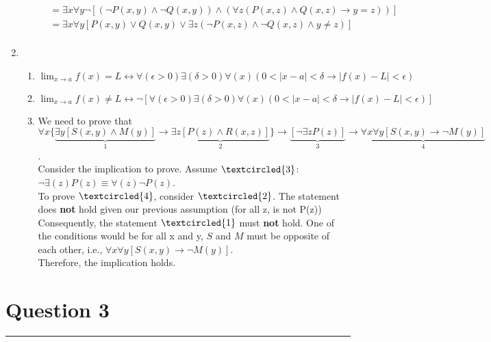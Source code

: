 \documentclass{article}
\begin{document}
\begin{enumerate}[label=\alph*.]
\begin{enumerate}[label=\roman*.]
\[\begin{aligned}
                             & = \exists x \forall y \neg[(\lnot P(x,y)\land\lnot Q(x,y)) \land (\forall z(P(x,z)\land Q(x,z) \rightarrow y=z))]                                                                                                         \\
                             & = \exists x \forall y [P(x,y)\lor Q(x,y) \lor \exists z(\neg P(x,z)\land \neg Q(x,z) \land y\neq z)]                                                                                                                      \\
                        \end{aligned}\]
          \end{enumerate}
    \item \begin{enumerate}[label=\roman*.]
              \item $\lim_{x\to a} f(x) = L \leftrightarrow \forall (\epsilon > 0) \exists (\delta > 0) \forall (x) (0 < |x - a| < \delta \rightarrow |f(x) - L| < \epsilon)$
              \item $\lim_{x\to a} f(x) \neq L \leftrightarrow \neg[\forall (\epsilon > 0) \exists (\delta > 0) \forall (x) (0 < |x - a| < \delta \rightarrow |f(x) - L| < \epsilon)]$
              \item We need to prove that $\forall x \{ \underbrace{\exists y [S(x, y) \land M(y)]}_1 \rightarrow \underbrace{\exists z [P(z) \land R(x, z)]}_2 \} \rightarrow \underbrace{[\neg \exists z P(z)]}_3 \rightarrow \underbrace{\forall x \forall y [S(x, y) \rightarrow \neg M(y)]}_4$.\\
                    Consider the implication to prove. Assume $\textcircled{3}$: $\neg \exists (z) P(z) \equiv \forall (z) \neg P(z)$.\\
                    To prove $\textcircled{4}$, consider $\textcircled{2}$. The statement does \textbf{not} hold given our previous assumption (for all z, is not P(z))\\
                    Consequently, the statement $\textcircled{1}$ must \textbf{not} hold. One of the conditions would be for all x and y, $S$ and $M$ must be opposite of each other, i.e., $\forall x \forall y [S(x, y) \rightarrow \neg M(y)]$.\\
                    Therefore, the implication holds.
          \end{enumerate}
\end{enumerate}

\section*{Question 3}
\hrule
\vspace{0.5cm}
\end{document}
